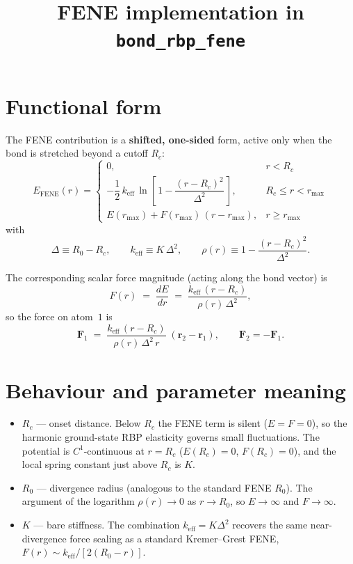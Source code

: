 \documentclass[11pt]{article}
\title{FENE implementation in \texttt{bond\_rbp\_fene}}
\author{}
\date{}
\begin{document}
\maketitle

\section*{Functional form}

The FENE contribution is a \textbf{shifted, one-sided} form, active only when
the bond is stretched beyond a cutoff $R_c$:
\begin{equation}
E_{\text{FENE}}(r) =
\begin{cases}
0, & r < R_c \\[6pt]
-\dfrac{1}{2}\, k_{\text{eff}}\,
\ln\!\left[\,1 - \dfrac{(r - R_c)^2}{\Delta^2}\,\right], & R_c \le r < r_{\max} \\[12pt]
E(r_{\max}) + F(r_{\max})\,(r - r_{\max}), & r \ge r_{\max}
\end{cases}
\end{equation}
with
\begin{equation}
\Delta \equiv R_0 - R_c, \qquad
k_{\text{eff}} \equiv K\,\Delta^2, \qquad
\rho(r) \equiv 1 - \frac{(r-R_c)^2}{\Delta^2}.
\end{equation}

The corresponding scalar force magnitude (acting along the bond vector) is
\begin{equation}
F(r) \;=\; \frac{dE}{dr}
\;=\; \frac{k_{\text{eff}}\,(r - R_c)}{\rho(r)\,\Delta^2},
\end{equation}
so the force on atom~$1$ is
\begin{equation}
\mathbf{F}_1 \;=\; \frac{k_{\text{eff}}\,(r-R_c)}{\rho(r)\,\Delta^2\,r}\;(\mathbf{r}_2-\mathbf{r}_1),
\qquad
\mathbf{F}_2 = -\mathbf{F}_1.
\end{equation}

\section*{Behaviour and parameter meaning}

\begin{itemize}
  \item \textbf{$R_c$} --- onset distance. Below $R_c$ the FENE term is silent
        ($E = F = 0$), so the harmonic ground-state RBP elasticity governs
        small fluctuations. The potential is $C^1$-continuous at $r = R_c$
        ($E(R_c) = 0$, $F(R_c) = 0$), and the local spring constant just above
        $R_c$ is $K$.
  \item \textbf{$R_0$} --- divergence radius (analogous to the standard FENE
        $R_0$). The argument of the logarithm $\rho(r) \to 0$ as $r \to R_0$,
        so $E \to \infty$ and $F \to \infty$.
  \item \textbf{$K$} --- bare stiffness. The combination
        $k_{\text{eff}} = K \Delta^2$ recovers the same near-divergence force
        scaling as a standard Kremer--Grest FENE,
        $F(r) \sim k_{\text{eff}} / [2(R_0 - r)]$.
\end{itemize}
\end{document}
